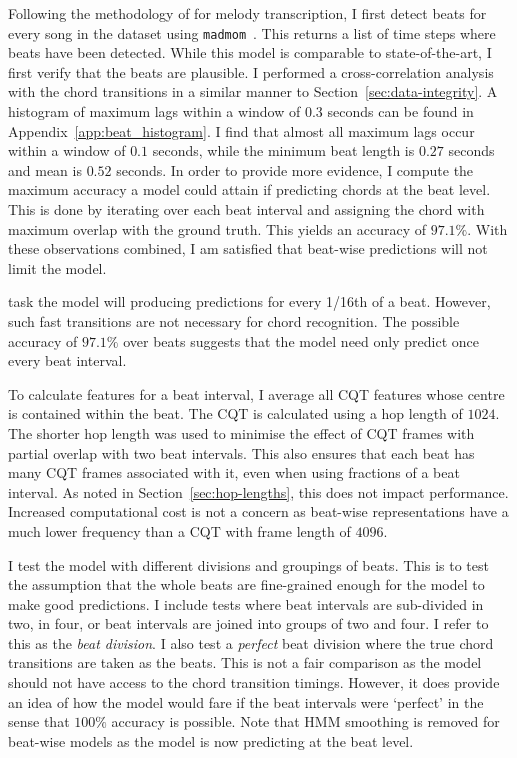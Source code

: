 Following the methodology of \citet{MelodyTranscriptionViaGenerativePreTraining} for melody transcription, I first detect beats for every song in the dataset using \texttt{madmom}~\citep{madmom}. This returns a list of time steps where beats have been detected. While this model is comparable to state-of-the-art, I first verify that the beats are plausible. I performed a cross-correlation analysis with the chord transitions in a similar manner to Section~\ref{sec:data-integrity}. A histogram of maximum lags within a window of $0.3$ seconds can be found in Appendix~\ref{app:beat_histogram}. I find that almost all maximum lags occur within a window of $0.1$ seconds, while the minimum beat length is $0.27$ seconds and mean is $0.52$ seconds. In order to provide more evidence, I compute the maximum accuracy a model could attain if predicting chords at the beat level. This is done by iterating over each beat interval and assigning the chord with maximum overlap with the ground truth. This yields an accuracy of $97.1\%$. With these observations combined, I am satisfied that beat-wise predictions will not limit the model.

\citet{MelodyTranscriptionViaGenerativePreTraining} task the model will producing predictions for every 1/16th of a beat. However, such fast transitions are not necessary for chord recognition. The possible accuracy of $97.1\%$ over beats suggests that the model need only predict once every beat interval.

To calculate features for a beat interval, I average all CQT features whose centre is contained within the beat. The CQT is calculated using a hop length of $1024$. The shorter hop length was used to minimise the effect of CQT frames with partial overlap with two beat intervals. This also ensures that each beat has many CQT frames associated with it, even when using fractions of a beat interval. As noted in Section~\ref{sec:hop-lengths}, this does not impact performance. Increased computational cost is not a concern as beat-wise representations have a much lower frequency than a CQT with frame length of $4096$.

I test the model with different divisions and groupings of beats. This is to test the assumption that the whole beats are fine-grained enough for the model to make good predictions. I include tests where beat intervals are sub-divided in two, in four, or beat intervals are joined into groups of two and four. I refer to this as the \emph{beat division}. I also test a \emph{perfect} beat division where the true chord transitions are taken as the beats. This is not a fair comparison as the model should not have access to the chord transition timings. However, it does provide an idea of how the model would fare if the beat intervals were `perfect' in the sense that $100\%$ accuracy is possible. Note that HMM smoothing is removed for beat-wise models as the model is now predicting at the beat level.


